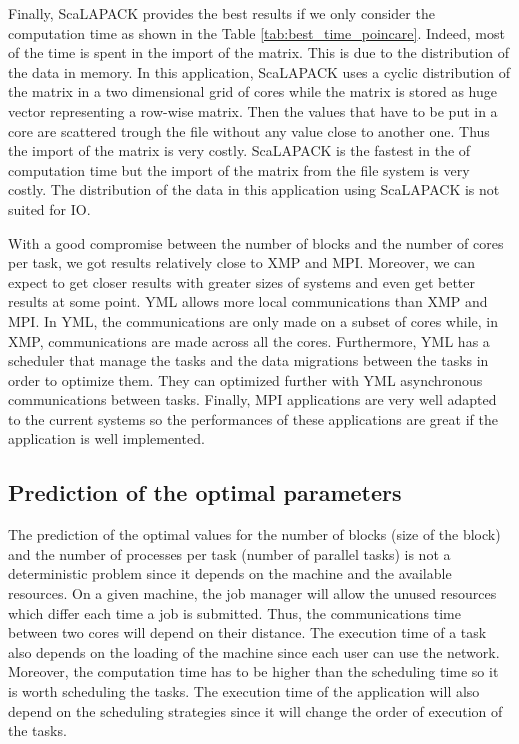 Finally, ScaLAPACK provides the best results if we only consider the computation time as shown in the Table \ref{tab:best_time_poincare}.
Indeed, most of the time is spent in the import of the matrix.
This is due to the distribution of the data in memory.
In this application, ScaLAPACK uses a cyclic distribution of the matrix in a two dimensional grid of cores while the matrix is stored as huge vector representing a row-wise matrix.
Then the values that have to be put in a core are scattered trough the file without any value close to another one.
Thus the import of the matrix is very costly.
ScaLAPACK is the fastest in the of computation time but the import of the matrix from the file system is very costly.
The distribution of the data in this application using ScaLAPACK is not suited for IO.

With a good compromise between the number of blocks and the number of cores per task, we got results relatively close to XMP and MPI.
Moreover, we can expect to get closer results with greater sizes of systems and even get better results at some point.
YML allows more local communications than XMP and MPI.
In YML, the communications are only made on a subset of cores while, in XMP, communications are made across all the cores.
Furthermore, YML has a scheduler that manage the tasks and the data migrations between the tasks in order to optimize them.
They can optimized further with YML asynchronous communications between tasks.
Finally, MPI applications are very well adapted to the current systems so the performances of these applications are great if the application is well implemented.

\subsection{Prediction of the optimal parameters}
The prediction of the optimal values for the number of blocks (size of the block) and the number of processes per task (number of parallel tasks) is not a deterministic problem since it depends on the machine and the available resources.
On a given machine, the job manager will allow the unused resources which differ each time a job is submitted.
Thus, the communications time between two cores will depend on their distance.
The execution time of a task also depends on the loading of the machine since each user can use the network.
Moreover, the computation time has to be higher than the scheduling time so it is worth scheduling the tasks.
The execution time of the application will also depend on the scheduling strategies since it will change the order of execution of the tasks.

